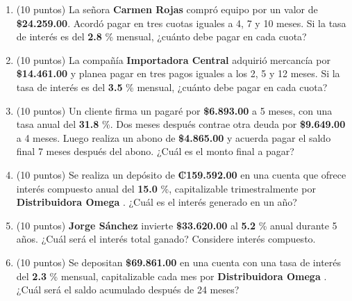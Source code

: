 \documentclass[10pt]{article}
\begin{document}
\begin{enumerate}[leftmargin=*, label=\textbf{\arabic*.}]
  \item (10 puntos) La señora \textbf{ Carmen Rojas } compró equipo por un valor de \textbf{\$\num{ 24,259.00 }}. Acordó pagar en tres cuotas iguales a 4, 7 y 10 meses. Si la tasa de interés es del \textbf{ 2.8 }\% mensual, ¿cuánto debe pagar en cada cuota?

  \vspace{0.5cm}

  \item (10 puntos) La compañía \textbf{ Importadora Central } adquirió mercancía por \textbf{\$\num{ 14,461.00 }} y planea pagar en tres pagos iguales a los 2, 5 y 12 meses. Si la tasa de interés es del \textbf{ 3.5 }\% mensual, ¿cuánto debe pagar en cada cuota?

  \vspace{0.5cm}

  \item (10 puntos) Un cliente firma un pagaré por \textbf{\$\num{ 6,893.00 }} a 5 meses, con una tasa anual del \textbf{ 31.8 }\%. Dos meses después contrae otra deuda por \textbf{\$\num{ 9,649.00 }} a 4 meses. Luego realiza un abono de \textbf{\$\num{ 4,865.00 }} y acuerda pagar el saldo final 7 meses después del abono. ¿Cuál es el monto final a pagar?

  \vspace{0.5cm}

  \item (10 puntos) Se realiza un depósito de \textbf{₡\num{ 159.592.00 }} en una cuenta que ofrece interés compuesto anual del \textbf{ 15.0 }\%, capitalizable trimestralmente por \textbf{ Distribuidora Omega }. ¿Cuál es el interés generado en un año?

  \vspace{0.5cm}

  \item (10 puntos) \textbf{ Jorge Sánchez } invierte \textbf{\$\num{ 33,620.00 }} al \textbf{ 5.2 }\% anual durante 5 años. ¿Cuál será el interés total ganado? Considere interés compuesto.

  \vspace{0.5cm}

  \item (10 puntos) Se depositan \textbf{\$\num{ 69,861.00 }} en una cuenta con una tasa de interés del \textbf{ 2.3 }\% mensual, capitalizable cada mes por \textbf{ Distribuidora Omega }. ¿Cuál será el saldo acumulado después de 24 meses?
\end{enumerate}
\end{document}
